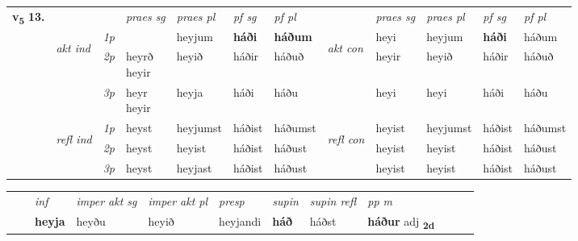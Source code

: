 \begin{tabular}{llllllllllll} \toprule
\multirow{4}{*}{{{\textbf{v{\textsubscript{5}}} \Large{\textbf{13.}}}}}  & &   &  \textit{praes sg}  & \textit{praes pl}  &\textit{ pf sg} & \textit{pf pl} &  &  \textit{praes sg}  & \textit{praes pl}  & \textit{pf sg} & \textit{pf pl } \\*
	\cmidrule{4-7} \cmidrule{9-12}
 & \multirow{3}{*}{\begin{turn}{90}\textit{akt ind}\end{turn}} & {\textit{1p}} & \textbf{\specialcell{hey\\ heyi}} & heyjum    & \textbf{háði} & \textbf{háðum} & \multirow{3}{*}{\begin{turn}{90}\textit{akt con}\end{turn}} &heyi & heyjum & \textbf{háði} & háðum\\*
& &  {\textit{2p}} &  \specialcell{heyrð\\ heyir}  & heyið   & háðir & háðuð & & heyir & heyið & háðir & háðuð \\*
& &  {\textit{3p}} & \specialcell{heyr\\ heyir} & heyja   & háði & háðu & & heyi & heyi& háði & háðu  \\*
\cmidrule{4-7} \cmidrule{9-12}
 &\multirow{3}{*}{\begin{turn}{90}\textit{refl ind}\end{turn}} & {\textit{1p}} & heyst & heyjumst    & háðist & háðumst & \multirow{3}{*}{\begin{turn}{90}\textit{refl con}\end{turn}}  &heyist & heyjumst & háðist & háðumst\\*
 &&  {\textit{2p}} &  heyst  & heyist   & háðist & háðust & &heyist & heyist & háðist & háðust \\*
& &  {\textit{3p}} & heyst & heyjast   & háðist & háðust & & heyist & heyist& háðist & háðust  \\*
\cmidrule{4-7} \cmidrule{9-12}
\end{tabular}


\begin{tabular}{llllllllllll}
 & & \textit{inf} & \textit{imper akt sg} & \textit{imper akt pl}   & \textit{presp} & \textit{supin} & \textit{supin refl} & \textit{pp m}     \\*
  & & \textbf{heyja} & heyðu  & heyið   & heyjandi &  \textbf{háð} & háðst & \textbf{háður} adj \textbf{\textsubscript{2d}} \\*
\cmidrule{1-12}
\end{tabular}



